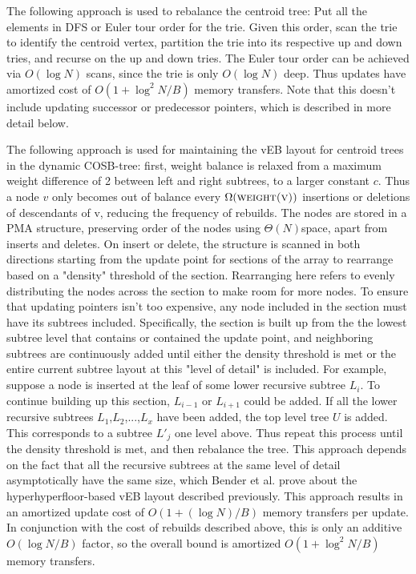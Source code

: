 \documentclass{style}
\begin{document}
The following approach is used to rebalance the centroid tree: Put all the
elements in DFS or Euler tour order for the trie. Given this order, scan the
trie to identify the centroid vertex, partition the trie into its respective
up and down tries, and recurse on the up and down tries. The Euler tour order
can be achieved via $O(\log{}N)$ scans, since the trie is only $O(\log{}N)$
deep. Thus updates have amortized cost of $O(1+\log^{2}N/B)$ memory transfers.
Note that this doesn't include updating successor or predecessor pointers,
which is described in more detail below.

The following approach is used for maintaining the vEB layout for centroid
trees in the dynamic COSB-tree: first, weight balance is relaxed from a
maximum weight difference of 2 between left and right subtrees, to a larger
constant $c$. Thus a node $v$ only becomes out of balance every
$\Omega(\textsc{weight(v)})$ insertions or deletions of descendants of v,
reducing the frequency of rebuilds. The nodes are stored in a PMA structure,
preserving order of the nodes using $\Theta(N)$space, apart from inserts and
deletes. On insert or delete, the structure is scanned in both directions
starting from the update point for sections of the array to rearrange based on
a "density" threshold of the section. Rearranging here refers to evenly
distributing the nodes across the section to make room for more nodes. To
ensure that updating pointers isn't too expensive, any node included in the
section must have its subtrees included. Specifically, the section is built up
from the the lowest subtree level that contains or contained the update point,
and neighboring subtrees are continuously added until either the density
threshold is met or the entire current subtree layout at this "level of
detail" is included. For example, suppose a node is inserted at the leaf of
some lower recursive subtree $L_{i}$. To continue building up this section,
$L_{i-1}$ or $L_{i+1}$ could be added. If all the lower recursive subtrees
$L_{1}$,$L_{2}$,...,$L_{x}$ have been added, the top level tree $U$ is added.
This corresponds to a subtree $L'_{j}$ one level above. Thus repeat this
process until the density threshold is met, and then rebalance the tree. This
approach depends on the fact that all the recursive subtrees at the same level
of detail asymptotically have the same size, which Bender et al. prove about
the hyperhyperfloor-based vEB layout described previously. This approach
results in an amortized update cost of $O(1+(\log{}N)/B)$ memory transfers per
update. In conjunction with the cost of rebuilds described above, this is only
an additive $O(\log{}N/B)$ factor, so the overall bound is amortized
$O(1+\log^{2}N/B)$ memory transfers.
\end{document}
